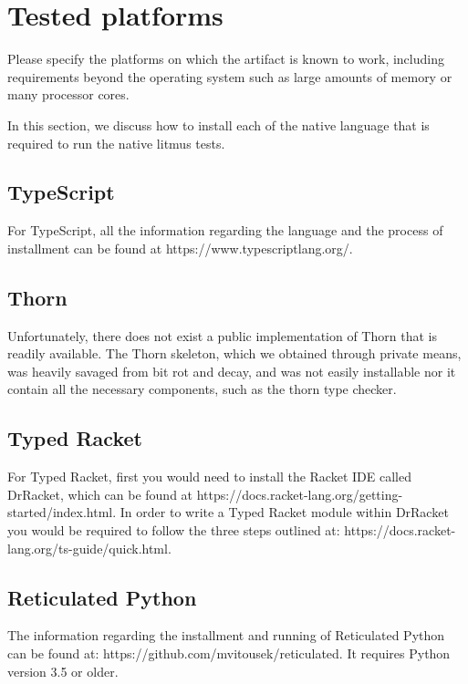 \documentclass[a4paper,UKenglish]{darts-v2018}
\newenvironment{platforms}{\section{Tested platforms}}{}
\begin{document}
\begin{platforms}
Please specify the platforms on which the artifact is known to
work, including requirements beyond the operating system such as large
amounts of memory or many processor cores.

In this section, we discuss how to install each of the native language that is required to run the native litmus tests.

\subsection{TypeScript}

For TypeScript, all the information regarding the language and the process of installment can be found at https://www.typescriptlang.org/.

\subsection{Thorn}

Unfortunately, there does not exist a public implementation of Thorn that is readily available. The Thorn skeleton, which we obtained through private means, was heavily savaged from bit rot and decay, and was not easily installable nor it contain all the necessary components, such as the thorn type checker.

\subsection{Typed Racket}

For Typed Racket, first you would need to install the Racket IDE called DrRacket, which can be found at https://docs.racket-lang.org/getting-started/index.html. In order to write a Typed Racket module within DrRacket you would be required to follow the three steps outlined at: https://docs.racket-lang.org/ts-guide/quick.html.


\subsection{Reticulated Python}

The information regarding the installment and running of Reticulated Python can be found at: https://github.com/mvitousek/reticulated. It requires Python version 3.5 or older.
\end{platforms}
\end{document}
